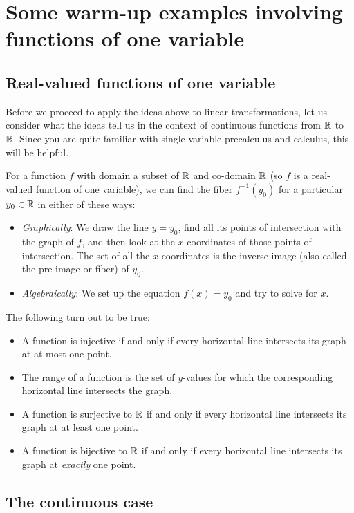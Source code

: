 \documentclass[10pt]{amsart}
\begin{document}
\section{Some warm-up examples involving functions of one variable}

\subsection{Real-valued functions of one variable}

Before we proceed to apply the ideas above to linear transformations,
let us consider what the ideas tell us in the context of continuous
functions from $\mathbb{R}$ to $\mathbb{R}$. Since you are quite familiar with
single-variable precalculus and calculus, this will be helpful.

For a function $f$ with domain a subset of $\mathbb{R}$ and co-domain $\mathbb{R}$ (so
$f$ is a real-valued function of one variable), we can find the fiber
$f^{-1}(y_0)$ for a particular $y_0 \in \mathbb{R}$ in either of these ways:

\begin{itemize}
\item {\em Graphically}: We draw the line $y = y_0$, find all its
  points of intersection with the graph of $f$, and then look at the
  $x$-coordinates of those points of intersection. The set of all the
  $x$-coordinates is the inverse image (also called the pre-image or
  fiber) of $y_0$.
\item {\em Algebraically}: We set up the equation $f(x) = y_0$ and try
  to solve for $x$.
\end{itemize}

The following turn out to be true:

\begin{itemize}
\item A function is injective if and only if every horizontal line
  intersects its graph at at most one point.
\item The range of a function is the set of $y$-values for which the
  corresponding horizontal line intersects the graph.
\item A function is surjective to $\mathbb{R}$ if and only if every horizontal
  line intersects its graph at at least one point.
\item A function is bijective to $\mathbb{R}$ if and only if every horizontal
  line intersects its graph at {\em exactly} one point.
\end{itemize}

\subsection{The continuous case}
\end{document}
